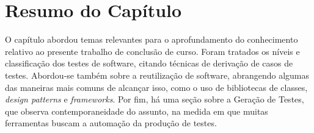 \section{Resumo do Capítulo}
O capítulo abordou temas relevantes para o aprofundamento do conhecimento
relativo ao presente trabalho de conclusão de curso. Foram tratados os níveis e classificação dos testes de software, citando técnicas de derivação de casos de testes. Abordou-se também sobre a reutilização de software, abrangendo
algumas das maneiras mais comuns de alcançar isso, como o uso de bibliotecas de
classes, \textit{design patterns} e \textit{frameworks}. Por fim, há uma seção sobre
a Geração de Testes, que observa contemporaneidade do assunto, na medida em que
muitas ferramentas buscam a automação da produção de testes.
